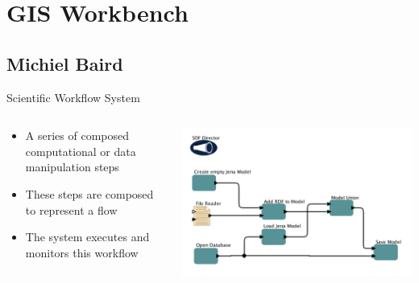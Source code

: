 \documentclass{beamer}
\begin{document}
{
 {
    \vfill
    \vskip2pt%
    \vskip2pt%

}

\section{GIS Workbench}
\subsection{Michiel Baird}

\begin{frame}{Scientific Workflow System}

    \begin{columns}
        \begin{column}{0.6\linewidth}
            \begin{itemize}
            \item A series of composed computational or data
                  manipulation steps
            \item These steps are composed to represent a flow
            \item The system executes and monitors this workflow
            \end{itemize}
        \end{column}
        \begin{column}{0.4\linewidth}
    \includegraphics[width=\linewidth]{images/workflow.png}
        \end{column}
    \end{columns}



\end{frame}}
\end{document}
